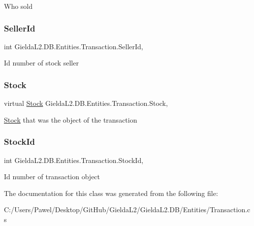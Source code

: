 Who sold 

\mbox{\label{class_gielda_l2_1_1_d_b_1_1_entities_1_1_transaction_a6948eeb4589ca30831f461b95b4f706d}} 
\subsubsection{\texorpdfstring{SellerId}{SellerId}}
{\footnotesize\ttfamily int Gielda\+L2.\+D\+B.\+Entities.\+Transaction.\+Seller\+Id\hspace{0.3cm}{\ttfamily [get]}, {\ttfamily [set]}}



Id number of stock seller 

\mbox{\label{class_gielda_l2_1_1_d_b_1_1_entities_1_1_transaction_a6cc9da6f7b5b6b95f74ee8943909e8e6}} 
\subsubsection{\texorpdfstring{Stock}{Stock}}
{\footnotesize\ttfamily virtual \mbox{\hyperlink{class_gielda_l2_1_1_d_b_1_1_entities_1_1_stock}{Stock}} Gielda\+L2.\+D\+B.\+Entities.\+Transaction.\+Stock\hspace{0.3cm}{\ttfamily [get]}, {\ttfamily [set]}}



\mbox{\hyperlink{class_gielda_l2_1_1_d_b_1_1_entities_1_1_stock}{Stock}} that was the object of the transaction 

\mbox{\label{class_gielda_l2_1_1_d_b_1_1_entities_1_1_transaction_a2f2b36047cdf38be85073df31d5557dd}} 
\subsubsection{\texorpdfstring{StockId}{StockId}}
{\footnotesize\ttfamily int Gielda\+L2.\+D\+B.\+Entities.\+Transaction.\+Stock\+Id\hspace{0.3cm}{\ttfamily [get]}, {\ttfamily [set]}}



Id number of transaction object 



The documentation for this class was generated from the following file\+:\begin{DoxyCompactItemize}
\item 
C\+:/\+Users/\+Pawel/\+Desktop/\+Git\+Hub/\+Gielda\+L2/\+Gielda\+L2.\+D\+B/\+Entities/Transaction.\+cs\end{DoxyCompactItemize}
